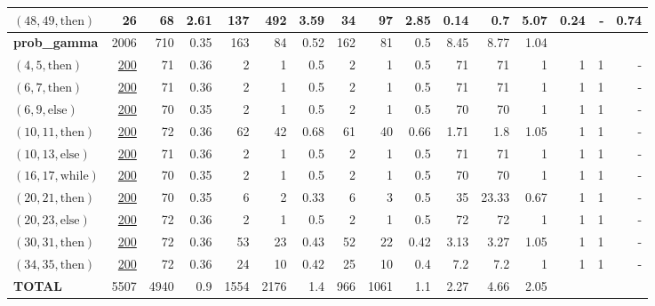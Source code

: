 \documentclass[sigconf,review, anonymous]{acmart}
\newcommand{\thenBr}{\text{then}}
\newcommand{\elseBr}{\text{else}}
\newcommand{\inWhile}{\text{while}}
\newcommand{\un}[1]{\underline{#1}}
\begin{document}
\begin{table}[!t]
\begin{tabular}{l|rrr|rrr|rrr|rrr|rrr}
    $(48,49,\thenBr)$        & 26       & 68   & 2.61      & 137  & 492  & 3.59         & 34  & 97  & 2.85             & 0.14   & 0.7   & 5.07   & 0.24 & - &  0.74 \\
    \hline
    \textbf{prob\_gamma}     & 2006     & 710  & 0.35      & 163 & 84   & 0.52          & 162 & 81  & 0.5              & 8.45   & 8.77  & 1.04   &  &   &        \\
    $(4,5,\thenBr)$          & \un{200} & 71   & 0.36      & 2   & 1    & 0.5           & 2   & 1   & 0.5              & 71     & 71    & 1      & 1 & 1 &  -  \\
    $(6,7,\thenBr)$          & \un{200} & 71   & 0.36      & 2   & 1    & 0.5           & 2   & 1   & 0.5              & 71     & 71    & 1      & 1 & 1 &  -  \\
    $(6,9,\elseBr)$          & \un{200} & 70   & 0.35      & 2   & 1    & 0.5           & 2   & 1   & 0.5              & 70     & 70    & 1      & 1 & 1 &  -  \\
    $(10,11,\thenBr)$        & \un{200} & 72   & 0.36      & 62  & 42   & 0.68          & 61  & 40  & 0.66             & 1.71   & 1.8   & 1.05   & 1 & 1 &  -  \\
    $(10,13,\elseBr)$        & \un{200} & 71   & 0.36      & 2   & 1    & 0.5           & 2   & 1   & 0.5              & 71     & 71    & 1      & 1 & 1 &  -  \\
    $(16,17,\inWhile)$       & \un{200} & 70   & 0.35      & 2   & 1    & 0.5           & 2   & 1   & 0.5              & 70     & 70    & 1      & 1 & 1 &  -  \\
    $(20,21,\thenBr)$        & \un{200} & 70   & 0.35      & 6   & 2    & 0.33          & 6   & 3   & 0.5              & 35     & 23.33 & 0.67   & 1 & 1 &  -  \\
    $(20,23,\elseBr)$        & \un{200} & 72   & 0.36      & 2   & 1    & 0.5           & 2   & 1   & 0.5              & 72     & 72    & 1      & 1 & 1 &  -  \\
    $(30,31,\thenBr)$        & \un{200} & 72   & 0.36      & 53  & 23   & 0.43          & 52  & 22  & 0.42             & 3.13   & 3.27  & 1.05   & 1 & 1 &  -  \\
    $(34,35,\thenBr)$        & \un{200} & 72   & 0.36      & 24  & 10   & 0.42          & 25  & 10  & 0.4              & 7.2    & 7.2   & 1      & 1 & 1 &  -  \\
    \midrule
    \textbf{TOTAL} & 5507      & 4940 & 0.9       & 1554 & 2176 & 1.4          & 966 & 1061 & 1.1             & 2.27   & 4.66  & 2.05       &   &   &    \\  
    \bottomrule
    \end{tabular}
\end{table}
\end{document}
